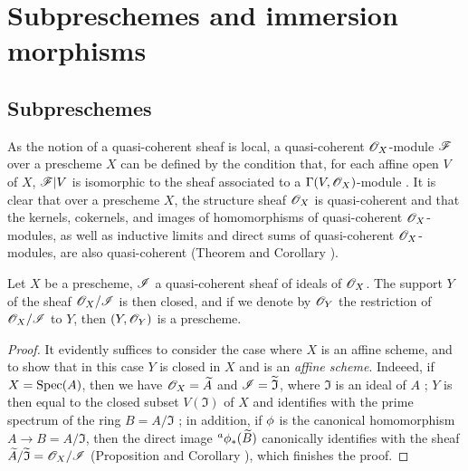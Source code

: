 \section{Subpreschemes and immersion morphisms}
\label{section-subpreschemes-and-immersion-morphisms}

\subsection{Subpreschemes}
\label{subsection-subpreschemes}

\begin{env}[4.1.1]
\label{1.4.1.1}
As the notion of a quasi-coherent sheaf  is local,
a quasi-coherent $\mathscr{O}_X$-module $\mathscr{F}$ over a prescheme $X$ can be defined by the condition
that, for each affine open $V$ of $X$, $\mathscr{F}|V$ is isomorphic to the sheaf associated to a
$\Gamma(V,\mathscr{O}_X)$-module . It is clear that over a prescheme
$X$, the structure sheaf $\mathscr{O}_X$ is quasi-coherent and that the kernels, cokernels, and
images of homomorphisms of quasi-coherent $\mathscr{O}_X$-modules, as well as inductive limits and
direct sums of quasi-coherent $\mathscr{O}_X$-modules, are also quasi-coherent
(Theorem  and Corollary ).
\end{env}

\begin{prop}[4.1.2]
\label{1.4.1.2}
Let $X$ be a prescheme, $\mathscr{I}$ a quasi-coherent sheaf of ideals of $\mathscr{O}_X$. The support
$Y$ of the sheaf $\mathscr{O}_X/\mathscr{I}$ is then closed, and if we denote by $\mathscr{O}_Y$ the restriction
of $\mathscr{O}_X/\mathscr{I}$ to $Y$, then $(Y,\mathscr{O}_Y)$ is a prescheme.
\end{prop}

\begin{proof}
\label{proof-1.4.1.2}
It evidently suffices  to consider the case where $X$ is an
affine scheme, and to show that in this case $Y$ is closed in $X$ and is an {\em affine
scheme}. Indeeed, if $X={\mathop{\mathrm{Spec}}\nolimits}(A)$, then we have $\mathscr{O}_X=\widetilde{A}$ and
$\mathscr{I}=\widetilde{\mathfrak{I}}$, where $\mathfrak{I}$ is an ideal of $A$
; $Y$ is then equal to the closed subset $V(\mathfrak{I})$ of
$X$ and identifies with the prime spectrum of the ring $B=A/\mathfrak{I}$
; in addition, if $\phi$ is the canonical
homomorphism $A\to B=A/\mathfrak{I}$, then the direct image ${}^a\phi_*(\widetilde{B})$
canonically identifies with the sheaf $\widetilde{A}/\widetilde{\mathfrak{I}}=\mathscr{O}_X/\mathscr{I}$
(Proposition  and Corollary ),
which finishes the proof.
\end{proof}

